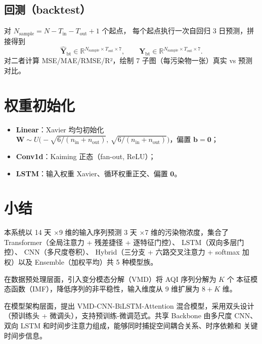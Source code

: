 \documentclass[11pt,a4paper]{article}
\newcommand{\R}{\mathbb{R}}
\newcommand{\mat}[1]{\bm{#1}}
\newcommand{\vect}[1]{\bm{#1}}
\begin{document}
\subsection{回测（backtest）}
对 $N_{\text{sample}} = N - T_{\text{in}} - T_{\text{out}} + 1$ 个起点，
每个起点执行一次自回归 3 日预测，拼接得到
\[
\widehat{\mat{Y}}_{\text{bt}} \in \R^{N_{\text{sample}}\times T_{\text{out}}\times 7},\qquad
\mat{Y}_{\text{bt}} \in \R^{N_{\text{sample}}\times T_{\text{out}}\times 7}.
\]
对二者计算 MSE/MAE/RMSE/R²，绘制 7 子图（每污染物一张）真实 vs 预测对比。

\section{权重初始化}
\begin{itemize}[leftmargin=*]
  \item \textbf{Linear}：Xavier 均匀初始化 $\mat{W} \sim U\!\bigl(-\sqrt{6/(n_{\text{in}} + n_{\text{out}})},\,\sqrt{6/(n_{\text{in}} + n_{\text{out}})}\bigr)$，偏置 $\vect{b} = \vect{0}$；
  \item \textbf{Conv1d}：Kaiming 正态（fan-out, ReLU）；
  \item \textbf{LSTM}：输入权重 Xavier、循环权重正交、偏置 $\vect{0}$。
\end{itemize}

\section{小结}
本系统以 14 天 ×9 维的输入序列预测 3 天 ×7 维的污染物浓度，集合了
Transformer（全局注意力 + 残差捷径 + 逐特征门控）、
LSTM（双向多层门控）、
CNN（多尺度卷积）、
Hybrid（三分支 + 六路交叉注意力 + softmax 加权）以及
Ensemble（加权平均）共 5 种模型族。

在数据预处理层面，引入变分模态分解（VMD）将 AQI 序列分解为 $K$ 个
本征模态函数（IMF），降低序列的非平稳性，输入维度从 9 维扩展为 $8+K$ 维。

在模型架构层面，提出 VMD-CNN-BiLSTM-Attention 混合模型，采用双头设计
（预训练头 + 微调头），支持预训练-微调范式。共享 Backbone 由多尺度 CNN、
双向 LSTM 和时间步注意力组成，能够同时捕捉空间耦合关系、时序依赖和
关键时间步信息。
\end{document}
